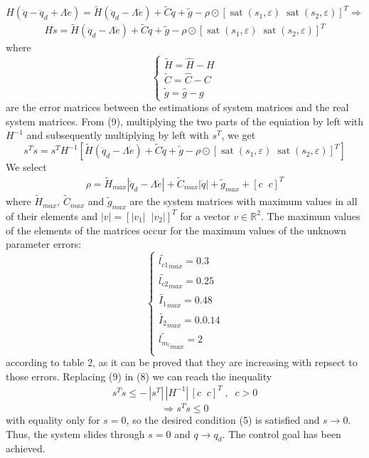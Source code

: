 \documentclass[a4paper]{article}
\newcommand\R{\mathbb{R}}
\begin{document}
    $$
        H (\ddot{q} - \ddot{q}_{d} + \Lambda \dot{e}) = 
        \tilde{H} (\ddot{q}_{d} - \Lambda \dot{e}) + \tilde{C} \dot{q} + \tilde{g} - \rho \odot [\operatorname{sat}(s_1, \varepsilon) \; \operatorname{sat}(s_2, \varepsilon)]^T \Rightarrow
    $$
    \begin{align}
        H \dot{s} = 
        \tilde{H} (\ddot{q}_{d} - \Lambda \dot{e}) + \tilde{C} \dot{q} + \tilde{g} - \rho \odot [\operatorname{sat}(s_1, \varepsilon) \; \operatorname{sat}(s_2, \varepsilon)]^T
    \end{align}
    where 
    $$
    \begin{cases}
        \tilde{H} = \hat{H} - H \\ 
        \tilde{C} = \hat{C} - C \\ 
        \tilde{g} = \hat{g} - g 
    \end{cases}
    $$
    are the error matrices between the estimations 
    of system matrices and the real system matrices. 
    From (9), multiplying the two parts of the equiation by left with $H^{-1}$ and subsequently multiplying by left with $s^T$, 
    we get 
    $$
        s^T \dot{s} = 
        s^T H^{-1} \left[ \tilde{H} (\ddot{q}_{d} - 
        \Lambda \dot{e}) + \tilde{C} \dot{q} + \tilde{g} - 
        \rho \odot [\operatorname{sat}(s_1, \varepsilon) \; \operatorname{sat}(s_2, \varepsilon)]^T \right]
    $$
    We select
    \begin{align}
        \rho = \tilde{H}_{max} | \ddot{q}_{d} - 
        \Lambda \dot{e} | + \tilde{C}_{max} | \dot{q} | + \tilde{g}_{max} + [c \;\; c]^T        
    \end{align}
    where $\tilde{H}_{max}$, $\tilde{C}_{max}$ and $\tilde{g}_{max}$ are the system matrices with maximum 
    values in all of their elements and $|v| = [|v_1| \;\; |v_2|]^T$ for a vector $v \in \R^2$. 
    The maximum values of the elements of the matrices occur for the maximum values of the unknown parameter errors: 
    $$
        \begin{cases}
            \tilde{l_{c1}}_{max} = 0.3 \\
            \tilde{l_{c2}}_{max} = 0.25 \\
            \tilde{I_{1}}_{max} = 0.48 \\
            \tilde{I_{2}}_{max} = 0.0.14 \\
            \tilde{l_{m_l}}_{max} = 2 \\
        \end{cases}
    $$
    according to table 2, as it can be proved that they are increasing with repsect to those errors. Replacing (9) in (8) 
    we can reach the inequality 
    \begin{align}
        s^T \dot{s} \le - \, |s^T| \, |H^{-1}| \, [c \;\; c]^T \;, \;\; c>0
    \end{align}
    $$
        \Rightarrow s^T \dot{s} \le 0       
    $$
    with equality only for $s=0$, so the desired condition (5) is satisfied and $s \rightarrow 0$. Thus, the system 
    slides through $s=0$ and $q \rightarrow q_d$. The control goal has been achieved.
\end{document}
